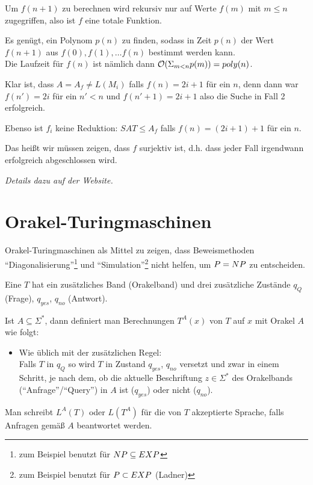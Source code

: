 Um $f(n+1)$ zu berechnen wird rekursiv nur auf Werte $f(m)$ mit $m \leq n$ zugegriffen, also ist $f$ eine totale Funktion.

Es genügt, ein Polynom $p(n)$ zu finden, sodass in Zeit $p(n)$ der Wert $f(n+1)$ aus $f(0), f(1), \dots f(n)$ bestimmt werden kann.\\
Die Laufzeit für $f(n)$ ist nämlich dann $\mathcal{O}(\Sigma_{m < n} p(m)) = poly(n)$.


Klar ist, dass $A = A_f \neq L(M_i)$ falls $f(n) = 2i+1$ für ein $n$, denn dann war $f(n') = 2i$ für ein $n' < n$ und $f(n'+1) = 2i+1$ also die Suche in Fall 2 erfolgreich.

Ebenso ist $f_i$ keine Reduktion: $SAT \leq A_f$ falls $f(n) = (2i+1)+1$ für ein $n$.

Das heißt wir müssen zeigen, dass $f$ surjektiv ist, d.h. dass jeder Fall irgendwann erfolgreich abgeschlossen wird.


\textit{Details dazu auf der Website.}












\section{Orakel-Turingmaschinen}


Orakel-Turingmaschinen als Mittel zu zeigen, dass Beweismethoden ``Diagonalisierung''\footnote{zum Beispiel benutzt für $NP \subseteq EXP$} und ``Simulation''\footnote{zum Beispiel benutzt für $P \subset EXP$ (Ladner)} nicht helfen, um $P = NP$ zu entscheiden.



\begin{definition}
    
    Eine  $T$ hat ein zusätzliches Band (Orakelband) und drei zusätzliche Zustände $q_Q$ (Frage), $q_{yes}$, $q_{no}$ (Antwort).

    Ist $A \subseteq \Sigma^\ast$, dann definiert man Berechnungen $T^A(x)$ von $T$ auf $x$ mit Orakel $A$ wie folgt:
    \begin{itemize}
        \item Wie üblich mit der zusätzlichen Regel:\\
            Falls $T$ in $q_Q$ so wird $T$ in Zustand $q_{yes}$, $q_{no}$ versetzt und zwar in einem Schritt, je nach dem, ob die aktuelle Beschriftung $z \in \Sigma^\ast$ des Orakelbands (``Anfrage''/``Query'') in $A$ ist ($q_{yes}$) oder nicht ($q_{no}$).
    \end{itemize}
    Man schreibt $L^A(T)$ oder $L(T^A)$ für die von $T$ akzeptierte Sprache, falls Anfragen gemäß $A$ beantwortet werden.

\end{definition}




